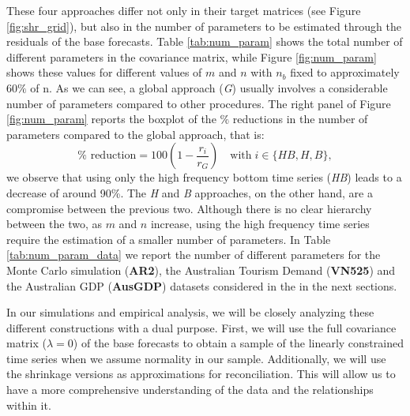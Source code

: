 \documentclass[a4paper,11pt]{article}
\theoremstyle{definition}
\begin{document}
These four approaches differ not only in their target matrices (see Figure \ref{fig:shr_grid}), but also in the number of parameters to be estimated through the residuals of the base forecasts. Table \ref{tab:num_param} shows the total number of different parameters in the covariance matrix, while Figure \ref{fig:num_param} shows these values for different values of $m$ and $n$ with $n_b$ fixed to approximately $60\%$ of n. As we can see, a global approach (\textit{G}) usually involves a considerable number of parameters compared to other procedures. The right panel of Figure \ref{fig:num_param} reports the boxplot of the $\%$ reductions in the number of parameters compared to the global approach, that is: 
$$
\% \text{ reduction} = 100\left(1-\frac{r_i}{r_G}\right) \quad \mathrm{with} \; i \in \{HB, H, B\},
$$
we observe that using only the high frequency bottom time series (\textit{HB}) leads to a decrease of around 90\%. The \textit{H} and \textit{B} approaches, on the other hand, are a compromise between the previous two. Although there is no clear hierarchy between the two, as $m$ and $n$ increase, using the high frequency time series require the estimation of a smaller number of parameters. In Table \ref{tab:num_param_data} we report the number of different parameters for the Monte Carlo simulation (\textbf{AR2}), the Australian Tourism Demand (\textbf{VN525}) and the Australian GDP (\textbf{AusGDP}) datasets considered in the in the next sections.

In our simulations and empirical analysis, we will be closely analyzing these different constructions with a dual purpose. First, we will use the full covariance matrix ($\lambda = 0$) of the base forecasts to obtain a sample of the linearly constrained time series when we assume normality in our sample. Additionally, we will use the shrinkage versions as approximations for reconciliation. This will allow us to have a more comprehensive understanding of the data and the relationships within it.
\end{document}
